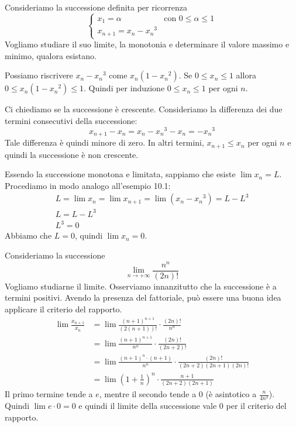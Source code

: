 \begin{example}
Consideriamo la successione definita per ricorrenza
\begin{equation*}
\begin{cases}
x_1 = \alpha & \mbox{con } 0 \le \alpha \le 1 \\
x_{n+1} = x_n - {x_n}^3
\end{cases}
\end{equation*}
Vogliamo studiare il suo limite, la monotonia e determinare il valore massimo e minimo, qualora esistano.

Possiamo riscrivere $x_n - {x_n}^3$ come $x_n(1-{x_n}^2)$. Se $0 \le x_n \le 1$ allora $0 \le x_n(1-{x_n}^2) \le 1$. Quindi per induzione $0 \le x_n \le 1$ per ogni $n$.

Ci chiediamo se la successione è crescente. Consideriamo la differenza dei due termini consecutivi della successione:
\begin{equation*}
x_{n+1}-x_n = x_n - {x_n}^3 - x_n = -{x_n}^3
\end{equation*}
Tale differenza è quindi minore di zero. In altri termini, $x_{n+1} \le x_n$ per ogni $n$ e quindi la successione è non crescente.

Essendo la successione monotona e limitata, sappiamo che esiste $\lim x_n = L$. Procediamo in modo analogo all'esempio 10.1:
\begin{gather*}
L = \lim x_n = \lim x_{n+1} = \lim (x_n-{x_n}^3) = L - L^3 \\
L = L - L^3 \\
L^3 = 0
\end{gather*}
Abbiamo che $L = 0$, quindi $\lim x_n = 0$.
\end{example}

\begin{example}
Consideriamo la successione
\begin{equation*}
\lim_{n \to +\infty} \frac{n^n}{(2n)!}
\end{equation*}
Vogliamo studiarne il limite. Osserviamo innanzitutto che la successione è a termini positivi. Avendo la presenza del fattoriale, può essere una buona idea applicare il criterio del rapporto.
\begin{align*}
\lim \frac{x_{n+1}}{x_n} &= \lim \frac{(n+1)^{n+1}}{(2(n+1))!} \cdot \frac{(2n)!}{n^n} \\
&= \lim \frac{(n+1)^{n+1}}{n^n} \cdot \frac{(2n)!}{(2n+2)!} \\
&= \lim \frac{(n+1)^n \cdot (n+1)}{n^n} \cdot \frac{(2n)!}{(2n+2)(2n+1)(2n)!} \\
&= \lim \left(1 + \frac{1}{n}\right)^n \cdot {\frac{n+1}{(2n+2)(2n+1)}}
\end{align*}
Il primo termine tende a $e$, mentre il secondo tende a 0 (è asintotico a $\frac{n}{4n^2}$). Quindi $\lim e \cdot 0 = 0$ e quindi il limite della successione vale 0 per il criterio del rapporto.
\end{example}


